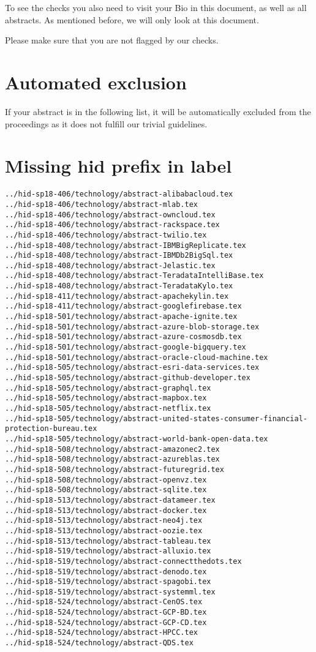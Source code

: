 To see the checks you also need to visit your Bio in this document, as
well as all abstracts. As mentioned before, we will only look at this
document.

Please make sure that you are not flagged by our checks. 

\section{Automated exclusion}

If your abstract is in the following list, it will be automatically
excluded from the proceedings as it does not fulfill our trivial
guidelines.

\section{Missing hid prefix in label}
\begin{verbatim}
../hid-sp18-406/technology/abstract-alibabacloud.tex
../hid-sp18-406/technology/abstract-mlab.tex
../hid-sp18-406/technology/abstract-owncloud.tex
../hid-sp18-406/technology/abstract-rackspace.tex
../hid-sp18-406/technology/abstract-twilio.tex
../hid-sp18-408/technology/abstract-IBMBigReplicate.tex
../hid-sp18-408/technology/abstract-IBMDb2BigSql.tex
../hid-sp18-408/technology/abstract-Jelastic.tex
../hid-sp18-408/technology/abstract-TeradataIntelliBase.tex
../hid-sp18-408/technology/abstract-TeradataKylo.tex
../hid-sp18-411/technology/abstract-apachekylin.tex
../hid-sp18-411/technology/abstract-googlefirebase.tex
../hid-sp18-501/technology/abstract-apache-ignite.tex
../hid-sp18-501/technology/abstract-azure-blob-storage.tex
../hid-sp18-501/technology/abstract-azure-cosmosdb.tex
../hid-sp18-501/technology/abstract-google-bigquery.tex
../hid-sp18-501/technology/abstract-oracle-cloud-machine.tex
../hid-sp18-505/technology/abstract-esri-data-services.tex
../hid-sp18-505/technology/abstract-github-developer.tex
../hid-sp18-505/technology/abstract-graphql.tex
../hid-sp18-505/technology/abstract-mapbox.tex
../hid-sp18-505/technology/abstract-netflix.tex
../hid-sp18-505/technology/abstract-united-states-consumer-financial-protection-bureau.tex
../hid-sp18-505/technology/abstract-world-bank-open-data.tex
../hid-sp18-508/technology/abstract-amazonec2.tex
../hid-sp18-508/technology/abstract-azureblas.tex
../hid-sp18-508/technology/abstract-futuregrid.tex
../hid-sp18-508/technology/abstract-openvz.tex
../hid-sp18-508/technology/abstract-sqlite.tex
../hid-sp18-513/technology/abstract-datameer.tex
../hid-sp18-513/technology/abstract-docker.tex
../hid-sp18-513/technology/abstract-neo4j.tex
../hid-sp18-513/technology/abstract-oozie.tex
../hid-sp18-513/technology/abstract-tableau.tex
../hid-sp18-519/technology/abstract-alluxio.tex
../hid-sp18-519/technology/abstract-connectthedots.tex
../hid-sp18-519/technology/abstract-denodo.tex
../hid-sp18-519/technology/abstract-spagobi.tex
../hid-sp18-519/technology/abstract-systemml.tex
../hid-sp18-524/technology/abstract-CenOS.tex
../hid-sp18-524/technology/abstract-GCP-BD.tex
../hid-sp18-524/technology/abstract-GCP-CD.tex
../hid-sp18-524/technology/abstract-HPCC.tex
../hid-sp18-524/technology/abstract-QDS.tex

\end{verbatim}
